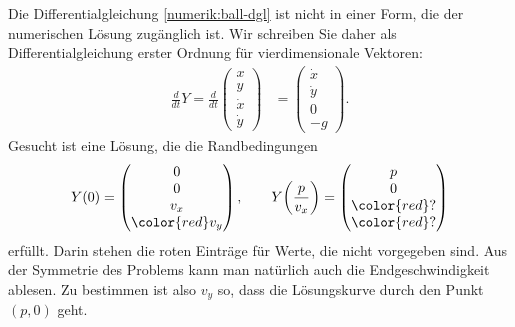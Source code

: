 Die Differentialgleichung \eqref{numerik:ball-dgl} ist nicht in einer
Form, die der numerischen Lösung zugänglich ist.
Wir schreiben Sie daher als Differentialgleichung erster Ordnung 
für vierdimensionale Vektoren:
\begin{align}
\frac{d}{dt}Y
=
\frac{d}{dt}\begin{pmatrix}x\\y\\\dot x\\\dot y\end{pmatrix}
&=
\begin{pmatrix}\dot x\\\dot y\\ 0\\ -g\end{pmatrix}.
\label{numerik:ball-dgl-1}
\end{align}
Gesucht ist eine Lösung, die die Randbedingungen
\begin{equation}
Y(0)
=
\begin{pmatrix}0\\0\\v_x\\\color{red}v_y\end{pmatrix},
\qquad
Y\biggl(\frac{p}{v_x}\biggr)
=
\begin{pmatrix}p\\0\\\color{red}?\\\color{red}?\end{pmatrix}
\label{numerik:ball-dgl-2}
\end{equation}
erfüllt.
Darin stehen die roten Einträge für Werte, die nicht vorgegeben sind.
Aus der Symmetrie des Problems kann man natürlich auch die Endgeschwindigkeit
ablesen.
%
%
Zu bestimmen ist also $v_y$ so, dass die Lösungskurve durch den Punkt
$(p,0)$ geht.
%


